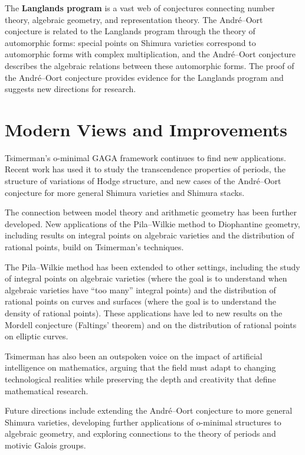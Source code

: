 The \textbf{Langlands program} is a vast web of conjectures connecting number theory, algebraic geometry, and representation theory. The Andr\'{e}--Oort conjecture is related to the Langlands program through the theory of automorphic forms: special points on Shimura varieties correspond to automorphic forms with complex multiplication, and the Andr\'{e}--Oort conjecture describes the algebraic relations between these automorphic forms. The proof of the Andr\'{e}--Oort conjecture provides evidence for the Langlands program and suggests new directions for research.

\section{Modern Views and Improvements}

Tsimerman's o-minimal GAGA framework continues to find new applications. Recent work has used it to study the transcendence properties of periods, the structure of variations of Hodge structure, and new cases of the Andr\'{e}--Oort conjecture for more general Shimura varieties and Shimura stacks.

The connection between model theory and arithmetic geometry has been further developed. New applications of the Pila--Wilkie method to Diophantine geometry, including results on integral points on algebraic varieties and the distribution of rational points, build on Tsimerman's techniques.

The Pila--Wilkie method has been extended to other settings, including the study of integral points on algebraic varieties (where the goal is to understand when algebraic varieties have ``too many'' integral points) and the distribution of rational points on curves and surfaces (where the goal is to understand the density of rational points). These applications have led to new results on the Mordell conjecture (Faltings' theorem) and on the distribution of rational points on elliptic curves.

Tsimerman has also been an outspoken voice on the impact of artificial intelligence on mathematics, arguing that the field must adapt to changing technological realities while preserving the depth and creativity that define mathematical research.

Future directions include extending the Andr\'{e}--Oort conjecture to more general Shimura varieties, developing further applications of o-minimal structures to algebraic geometry, and exploring connections to the theory of periods and motivic Galois groups.

